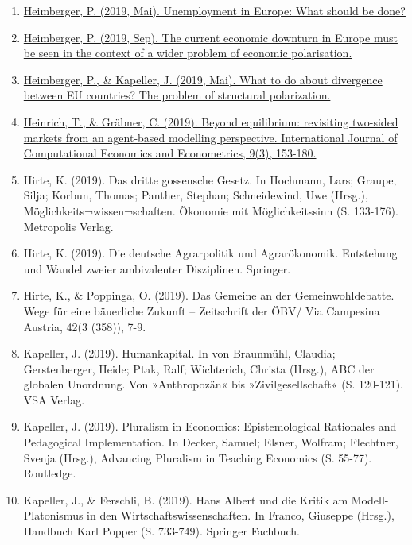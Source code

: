 \begin{enumerate}
	 \item \href{https://wiiw.ac.at/unemployment-in-europe-what-should-be-done-n-378.html}{Heimberger, P. (2019, Mai). Unemployment in Europe: What should be done?}
	 \item \href{https://wiiw.ac.at/the-current-economic-downturn-in-europe-must-be-seen-in-the-context-of-a-wider-problem-of-economic-polarisation-n-396.html}{Heimberger, P. (2019, Sep). The current economic downturn in Europe must be seen in the context of a wider problem of economic polarisation.}
	 \item \href{https://euprogressiveplatform.com/2019/05/01/what-to-do-about-divergence-between-eu-countries-the-problem-of-structural-polarization/}{Heimberger, P., \& Kapeller, J. (2019, Mai). What to do about divergence between EU countries? The problem of structural polarization.}
	 \item \href{https://doi.org/10.1504/ijcee.2019.100558}{Heinrich, T., \& Gräbner, C. (2019). Beyond equilibrium: revisiting two-sided markets from an agent-based modelling perspective. International Journal of Computational Economics and Econometrics, 9(3), 153-180.}
	 \item Hirte, K. (2019). Das dritte gossensche Gesetz. In Hochmann, Lars; Graupe, Silja; Korbun, Thomas; Panther, Stephan; Schneidewind, Uwe (Hrsg.), Möglichkeits¬wissen¬schaften. Ökonomie mit Möglichkeitssinn (S. 133-176). Metropolis Verlag.
	 \item Hirte, K. (2019). Die deutsche Agrarpolitik und Agrarökonomik. Entstehung und Wandel zweier ambivalenter Disziplinen. Springer.
	 \item Hirte, K., \& Poppinga, O. (2019). Das Gemeine an der Gemeinwohldebatte. Wege für eine bäuerliche Zukunft – Zeitschrift der ÖBV/ Via Campesina Austria, 42(3 (358)), 7-9.
	 \item Kapeller, J. (2019). Humankapital. In von Braunmühl, Claudia; Gerstenberger, Heide; Ptak, Ralf; Wichterich, Christa (Hrsg.), ABC der globalen Unordnung. Von »Anthropozän« bis »Zivilgesellschaft« (S. 120-121). VSA Verlag.
	 \item Kapeller, J. (2019). Pluralism in Economics: Epistemological Rationales and Pedagogical Implementation. In Decker, Samuel; Elsner, Wolfram; Flechtner, Svenja (Hrsg.), Advancing Pluralism in Teaching Economics (S. 55-77). Routledge.
	 \item Kapeller, J., \& Ferschli, B. (2019). Hans Albert und die Kritik am Modell-Platonismus in den Wirtschaftswissenschaften. In Franco, Giuseppe (Hrsg.), Handbuch Karl Popper (S. 733-749). Springer Fachbuch.

\end{enumerate}
